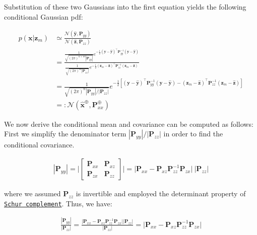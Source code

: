 Substitution of these two Gaussians into the first equation yields the following conditional Gaussian pdf\+:

\begin{align*} p(\mathbf{x} | \mathbf{z}_m) &\simeq \frac{\mathcal N(\hat{\mathbf y}, \mathbf P_{yy})}{\mathcal N (\hat{\mathbf z}, \mathbf P_{zz}) }\\ &= \frac{\frac{1}{\sqrt{(2\pi)^{n+m}|{\mathbf{P}_{yy}}|}}e^{-\frac{1}{2}(\mathbf{y}-\hat{\mathbf{y}})^\top\mathbf{P}_{yy}^{-1}(\mathbf{y}-\hat{\mathbf{y}})}}{ \frac{1}{\sqrt{(2\pi)^{m}|{\mathbf{P}_{zz}}|}}e^{-\frac{1}{2}(\mathbf{z}_m-\hat{\mathbf{z}})^\top\mathbf{P}_{zz}^{-1}(\mathbf{z}_m-\hat{\mathbf{z}})}}\\ &= \frac{1}{\sqrt{(2\pi)^{n}|{\mathbf{P}_{yy}}|/|{\mathbf{P}_{zz}}|}} e^{ {-\frac{1}{2}\left[ (\mathbf{y}-\hat{\mathbf{y}})^\top\mathbf{P}_{yy}^{-1}(\mathbf{y}-\hat{\mathbf{y}}) - (\mathbf{z}_m-\hat{\mathbf{z}})^\top\mathbf{P}_{zz}^{-1}(\mathbf{z}_m-\hat{\mathbf{z}}) \right]} }\\ &=: \mathcal N (\hat{\mathbf x}^\oplus, \mathbf P_{xx}^\oplus) \end{align*}

We now derive the conditional mean and covariance can be computed as follows\+: First we simplify the denominator term $|{\mathbf{P}_{yy}}|/|{\mathbf{P}_{zz}}|$ in order to find the conditional covariance.

\begin{align*} |{\mathbf{P}_{yy}}| = \Big|{\begin{bmatrix} \mathbf{P}_{xx} & \mathbf{P}_{xz} \\ \mathbf{P}_{zx} & \mathbf{P}_{zz} \end{bmatrix}}\Big| = \Big|{\mathbf{P}_{xx} - \mathbf{P}_{xz}\mathbf{P}_{zz}^{-1}\mathbf{P}_{zx}}\Big|\ \Big|{\mathbf{P}_{zz}}\Big| \end{align*}

where we assumed $\mathbf{P}_{zz}$ is invertible and employed the determinant property of \href{https://en.wikipedia.org/wiki/Schur_complement}{\tt Schur complement}. Thus, we have\+:

\begin{align*} \frac{|{\mathbf{P}_{yy}}|}{|{\mathbf{P}_{zz}}|} = \frac{\Big|{\mathbf{P}_{xx} - \mathbf{P}_{xz}\mathbf{P}_{zz}^{-1}\mathbf{P}_{zx}}\Big|\Big|{\mathbf{P}_{zz}}\Big|}{|{\mathbf{P}_{zz}}|} = \Big|{\mathbf{P}_{xx} - \mathbf{P}_{xz}\mathbf{P}_{zz}^{-1}\mathbf{P}_{zx}}\Big| \end{align*}

